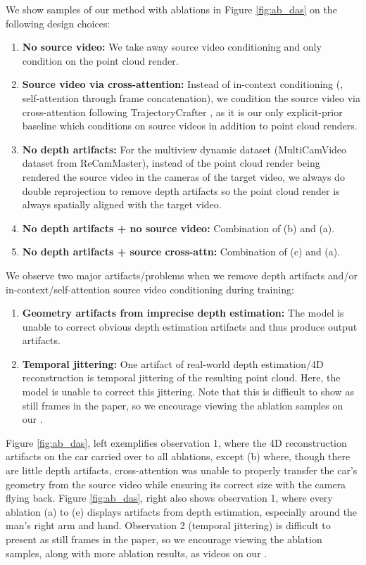 We show samples of our method with ablations in Figure \ref{fig:ab_das} on the following design choices:
\begin{enumerate}[label={\alph*)}]
    \item \textbf{No source video:} We take away source video conditioning and only condition on the point cloud render.
    \item \textbf{Source video via cross-attention:} Instead of in-context conditioning (\ie, self-attention through frame concatenation), we condition the source video via cross-attention following TrajectoryCrafter \cite{yu2025trajcraft}, as it is our only explicit-prior baseline which conditions on source videos in addition to point cloud renders.
    \item \textbf{No depth artifacts:} For the multiview dynamic dataset (MultiCamVideo dataset from ReCamMaster), instead of the point cloud render being rendered the source video in the cameras of the target video, we always do double reprojection to remove depth artifacts so the point cloud render is always spatially aligned with the target video.
    \item \textbf{No depth artifacts + no source video:} Combination of (b) and (a).
    \item \textbf{No depth artifacts + source cross-attn:} Combination of (c) and (a).
\end{enumerate}

We observe two major artifacts/problems when we remove depth artifacts and/or in-context/self-attention source video conditioning during training:
\begin{enumerate}
    \item \textbf{Geometry artifacts from imprecise depth estimation:} The model is unable to correct obvious depth estimation artifacts and thus produce output artifacts.
    \item \textbf{Temporal jittering:} One artifact of real-world depth estimation/4D reconstruction is temporal jittering of the resulting point cloud. Here, the model is unable to correct this jittering. Note that this is difficult to show as still frames in the paper, so we encourage viewing the ablation samples on our \projectpage.
\end{enumerate}
Figure \ref{fig:ab_das}, left exemplifies observation 1, where the 4D reconstruction artifacts on the car carried over to all ablations, except (b) where, though there are little depth artifacts, cross-attention was unable to properly transfer the car's geometry from the source video while ensuring its correct size with the camera flying back. Figure \ref{fig:ab_das}, right also shows observation 1, where every ablation (a) to (e) displays artifacts from depth estimation, especially around the man's right arm and hand. Observation 2 (temporal jittering) is difficult to present as still frames in the paper, so we encourage viewing the ablation samples, along with more ablation results, as videos on our \projectpage.

